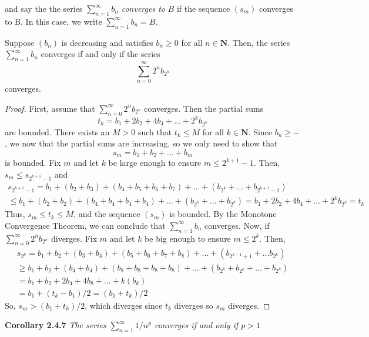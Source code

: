     and say the the series $\sum_{n=1}^\infty b_n$ \textit{converges to} $B$ if the sequence $(s_m)$ converges to B. In this case, we write $\sum_{n=1}^\infty b_n = B$.
    \setcounter{theorem}{6}
    \begin{theorem}
        Suppose $(b_n)$ is decreasing and satisfies $b_n \geq 0$ for all $n \in \textbf{N}$. Then, the series $\sum_{n=1}^\infty b_n$ converges if and only if the series
        \begin{equation*}
            \sum_{n=0}^\infty 2^nb_{2^n}
        \end{equation*}
        converges.
    \end{theorem}
    \begin{proof}
        First, assume that $\sum_{n=0}^\infty 2^nb_{2^n}$ converges. Then the partial sums
        \begin{equation*}
            t_k = b_1 + 2b_2 + 4b_4 + \dots + 2^kb_{2^k}
        \end{equation*}
        are bounded. There exists an $M > 0$ such that $t_k \leq M$ for all $k \in \textbf{N}$. Since $b_n \geq -$, we now that the partial sums are increasing, so we only need to show that 
        \begin{equation*}
            s_m = b_1 + b_2 + \dots + b_m
        \end{equation*}
        is bounded.
        \newline \indent
        Fix $m$ and let $k$ be large enough to ensure $m \leq 2^{k+1} - 1$. Then, $s_m \leq s_{2^{k+1}-1}$ and
        \begin{align*}
            s_{2^{k+1}-1} = b_1 + (b_2 + b_3) + (b_4 + b_5 + b_6 + b_7) + \dots + (b_{2^k} + \dots + b_{2^{k+1} - 1}) \\
            \leq b_1 + (b_2 + b_2) + (b_4 + b_4 + b_4 + b_4) + \dots + (b_{2^k} + \dots + b_{2^k})
            = b_1 + 2b_2 + 4b_4 + \dots + 2^kb_{2^k} = t_k
        \end{align*}
        Thus, $s_m \leq t_k \leq M$, and the sequence $(s_m)$ is bounded. By the Monotone Convergence Theorem, we can conclude that $\sum_{n=1}^\infty b_n$ converges.
        \newline \indent
        Now, if $\sum_{n=0}^\infty 2^nb_{2^n}$ diverges. Fix $m$ and let $k$ be big enough to ensure $m \leq 2^k$. Then, 
        \begin{align*}
            s_{2^k} = b_1 + b_2 + (b_3 + b_4) + (b_5 + b_6 + b_7 + b_8) + \dots + (b_{2^{k - 1} + 1} + \dots b_{2^k}) \\
            \geq b_1 + b_2 + (b_4 + b_4) + (b_8 + b_8 + b_8 + b_8) + \dots + (b_{2^k} + b_{2^k} + \dots + b_{2^k}) \\
            = b_1 + b_2 + 2b_4 + 4b_8 + \dots + k(b_k) \\
            = b_1 + (t_k - b_1)/2 = (b_1 + t_k) / 2
        \end{align*}
        So, $s_m > (b_1 + t_k) / 2$, which diverges since $t_k$ diverges so $s_m$ diverges.
    \end{proof}
    \textbf{Corollary 2.4.7} \textit{The series $\sum_{n=1}^\infty 1/n^p$ converges if and only if $p > 1$}